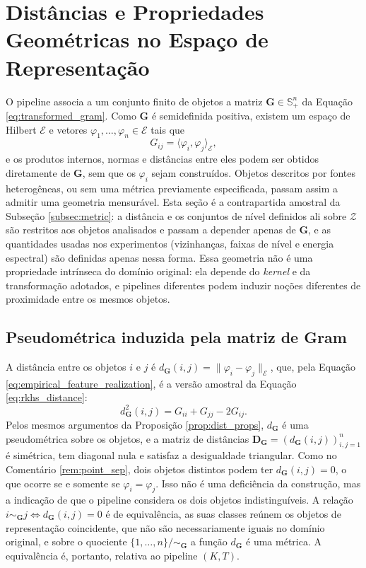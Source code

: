 
\section{Distâncias e Propriedades Geométricas no Espaço de Representação}
\label{sec:representation_geometry}

O pipeline associa a um conjunto finito de objetos a matriz $\mathbf{G}\in\mathbb{S}_+^n$ da Equação \eqref{eq:transformed_gram}. Como $\mathbf{G}$ é semidefinida positiva, existem um espaço de Hilbert $\mathcal{E}$ e vetores $\varphi_1,\dots,\varphi_n\in\mathcal{E}$ tais que
\begin{equation}\label{eq:empirical_feature_realization}
    G_{ij} = \langle \varphi_i, \varphi_j \rangle_{\mathcal{E}},
\end{equation}
e os produtos internos, normas e distâncias entre eles podem ser obtidos diretamente de $\mathbf{G}$, sem que os $\varphi_i$ sejam construídos. Objetos descritos por fontes heterogêneas, ou sem uma métrica previamente especificada, passam assim a admitir uma geometria mensurável. Esta seção é a contrapartida amostral da Subseção \ref{subsec:metric}: a distância e os conjuntos de nível definidos ali sobre $\mathcal{Z}$ são restritos aos objetos analisados e passam a depender apenas de $\mathbf{G}$, e as quantidades usadas nos experimentos (vizinhanças, faixas de nível e energia espectral) são definidas apenas nessa forma. Essa geometria não é uma propriedade intrínseca do domínio original: ela depende do \textit{kernel} e da transformação adotados, e pipelines diferentes podem induzir noções diferentes de proximidade entre os mesmos objetos.

\subsection{Pseudométrica induzida pela matriz de Gram}
\label{subsec:gram_pseudometric}

A distância entre os objetos $i$ e $j$ é $d_{\mathbf{G}}(i,j) = \|\varphi_i-\varphi_j\|_{\mathcal{E}}$, que, pela Equação \eqref{eq:empirical_feature_realization}, é a versão amostral da Equação \eqref{eq:rkhs_distance}:
\begin{equation}\label{eq:gram_distance}
    d_{\mathbf{G}}^2(i,j) = G_{ii} + G_{jj} - 2G_{ij}.
\end{equation}
Pelos mesmos argumentos da Proposição \ref{prop:dist_props}, $d_{\mathbf{G}}$ é uma pseudométrica sobre os objetos, e a matriz de distâncias $\mathbf{D}_{\mathbf{G}} = (d_{\mathbf{G}}(i,j))_{i,j=1}^n$ é simétrica, tem diagonal nula e satisfaz a desigualdade triangular. Como no Comentário \ref{rem:point_sep}, dois objetos distintos podem ter $d_{\mathbf{G}}(i,j) = 0$, o que ocorre se e somente se $\varphi_i = \varphi_j$. Isso não é uma deficiência da construção, mas a indicação de que o pipeline considera os dois objetos indistinguíveis. A relação $i\sim_{\mathbf{G}}j \iff d_{\mathbf{G}}(i,j)=0$ é de equivalência, as suas classes reúnem os objetos de representação coincidente, que não são necessariamente iguais no domínio original, e sobre o quociente $\{1,\dots,n\}/{\sim_{\mathbf{G}}}$ a função $d_{\mathbf{G}}$ é uma métrica. A equivalência é, portanto, relativa ao pipeline $(K,T)$.

